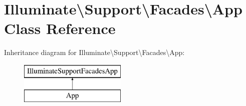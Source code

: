 \hypertarget{class_illuminate_1_1_support_1_1_facades_1_1_app}{}\section{Illuminate\textbackslash{}Support\textbackslash{}Facades\textbackslash{}App Class Reference}
\label{class_illuminate_1_1_support_1_1_facades_1_1_app}
Inheritance diagram for Illuminate\textbackslash{}Support\textbackslash{}Facades\textbackslash{}App\+:\begin{figure}[H]
\begin{center}
\leavevmode
\includegraphics[height=2.000000cm]{class_illuminate_1_1_support_1_1_facades_1_1_app}
\end{center}
\end{figure}
